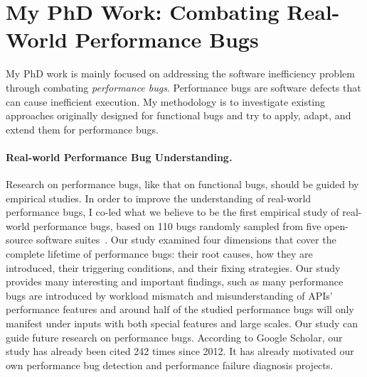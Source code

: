 \documentclass[10pt]{article}
\begin{document}
\vspace{-.1in}
\section{My PhD Work: Combating Real-World Performance Bugs}

My PhD work is mainly focused on addressing the software 
inefficiency problem through combating {\it performance bugs}. 
Performance bugs are software defects that can cause inefficient execution. 
My methodology is to investigate existing approaches originally designed for functional bugs
and try to apply, adapt, and extend them for performance bugs. 

\vspace{-.1in}
\paragraph{Real-world Performance Bug Understanding.}
Research on performance bugs, like that on functional bugs, 
should be guided by empirical studies. 
In order to improve the understanding of real-world performance bugs, 
I co-led what we believe to be the first 
empirical study of real-world performance bugs, 
based on 110 bugs randomly sampled from five open-source software suites~\cite{jin12perfbug}. 
Our study examined four dimensions 
that cover the complete lifetime of performance bugs:
their root causes, 
how they are introduced, their triggering conditions, and their fixing strategies. 
Our study provides many interesting and important findings, 
such as many performance bugs are introduced by workload mismatch 
and misunderstanding of APIs' performance features
and around half of the studied performance bugs 
will only manifest under inputs with both special features and large scales. 
Our study can guide future research on performance bugs.
According to Google Scholar, our study has already been cited 
242 times since 2012. 
It has already motivated our own performance bug detection 
and performance failure diagnosis projects.

\vspace{-.1in}
\end{document}
